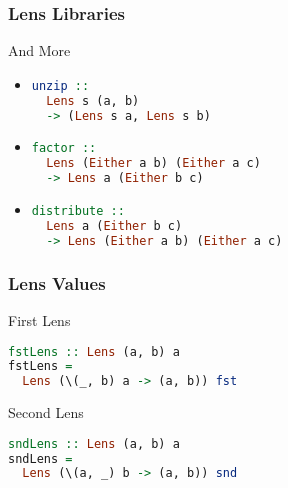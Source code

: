 \begin{frame}[fragile]
\frametitle{Lens Libraries}

\begin{block}{And More}
\begin{itemize}
\item \begin{lstlisting}[language=haskell]
unzip ::
  Lens s (a, b)
  -> (Lens s a, Lens s b)
\end{lstlisting}

\item \begin{lstlisting}[language=haskell]
factor ::
  Lens (Either a b) (Either a c)
  -> Lens a (Either b c)
\end{lstlisting}

\item \begin{lstlisting}[language=haskell]
distribute ::
  Lens a (Either b c)
  -> Lens (Either a b) (Either a c)
\end{lstlisting}
\end{itemize}
\end{block}

\end{frame}
\begin{frame}[fragile]
\frametitle{Lens Values}

\begin{block}{First Lens}
\begin{lstlisting}[language=haskell]
fstLens :: Lens (a, b) a
fstLens =
  Lens (\(_, b) a -> (a, b)) fst
\end{lstlisting}
\end{block}
\begin{block}{Second Lens}
\begin{lstlisting}[language=haskell]
sndLens :: Lens (a, b) a
sndLens =
  Lens (\(a, _) b -> (a, b)) snd
\end{lstlisting}
\end{block}

\end{frame}

